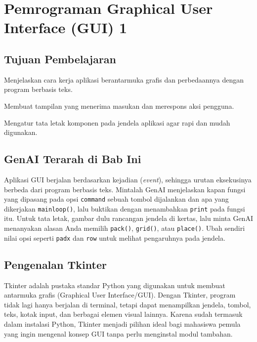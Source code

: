 \chapter{Pemrograman Graphical User Interface (GUI) 1}

\section*{Tujuan Pembelajaran}
\begin{daftarrapat}
  \item Menjelaskan cara kerja aplikasi berantarmuka grafis dan perbedaannya dengan program berbasis teks.
  \item Membuat tampilan yang menerima masukan dan merespons aksi pengguna.
  \item Mengatur tata letak komponen pada jendela aplikasi agar rapi dan mudah digunakan.
\end{daftarrapat}

\section*{GenAI Terarah di Bab Ini}

Aplikasi GUI berjalan berdasarkan kejadian (\textit{event}), sehingga urutan eksekusinya berbeda dari program berbasis teks. Mintalah GenAI menjelaskan kapan fungsi yang dipasang pada opsi \texttt{command} sebuah tombol dijalankan dan apa yang dikerjakan \texttt{mainloop()}, lalu buktikan dengan menambahkan \texttt{print} pada fungsi itu. Untuk tata letak, gambar dulu rancangan jendela di kertas, lalu minta GenAI menanyakan alasan Anda memilih \texttt{pack()}, \texttt{grid()}, atau \texttt{place()}. Ubah sendiri nilai opsi seperti \texttt{padx} dan \texttt{row} untuk melihat pengaruhnya pada jendela.

\section{Pengenalan Tkinter}

Tkinter adalah pustaka standar Python yang digunakan untuk membuat antarmuka grafis (Graphical User Interface/GUI). Dengan Tkinter, program tidak lagi hanya berjalan di terminal, tetapi dapat menampilkan jendela, tombol, teks, kotak input, dan berbagai elemen visual lainnya. Karena sudah termasuk dalam instalasi Python, Tkinter menjadi pilihan ideal bagi mahasiswa pemula yang ingin mengenal konsep GUI tanpa perlu menginstal modul tambahan.

